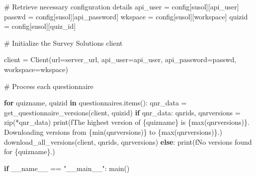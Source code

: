 \documentclass[
  letterpaper,
  DIV=11,
  numbers=noendperiod]{scrreprt}
\newenvironment{Shaded}{\begin{snugshade}}{\end{snugshade}}
\newcommand{\BuiltInTok}[1]{\textcolor[rgb]{0.00,0.23,0.31}{#1}}
\newcommand{\CommentTok}[1]{\textcolor[rgb]{0.37,0.37,0.37}{#1}}
\newcommand{\ControlFlowTok}[1]{\textcolor[rgb]{0.00,0.23,0.31}{\textbf{#1}}}
\newcommand{\KeywordTok}[1]{\textcolor[rgb]{0.00,0.23,0.31}{\textbf{#1}}}
\newcommand{\NormalTok}[1]{\textcolor[rgb]{0.00,0.23,0.31}{#1}}
\newcommand{\OperatorTok}[1]{\textcolor[rgb]{0.37,0.37,0.37}{#1}}
\newcommand{\SpecialCharTok}[1]{\textcolor[rgb]{0.37,0.37,0.37}{#1}}
\newcommand{\SpecialStringTok}[1]{\textcolor[rgb]{0.13,0.47,0.30}{#1}}
\newcommand{\StringTok}[1]{\textcolor[rgb]{0.13,0.47,0.30}{#1}}
\newcommand{\VariableTok}[1]{\textcolor[rgb]{0.07,0.07,0.07}{#1}}
\begin{document}
\begin{Shaded}
\begin{Highlighting}[]
    

    \CommentTok{\# Retrieve necessary configuration details}
\NormalTok{    api\_user }\OperatorTok{=}\NormalTok{ config[}\StringTok{\textquotesingle{}susol\textquotesingle{}}\NormalTok{][}\StringTok{\textquotesingle{}api\_user\textquotesingle{}}\NormalTok{]}
\NormalTok{    passwd }\OperatorTok{=}\NormalTok{ config[}\StringTok{\textquotesingle{}susol\textquotesingle{}}\NormalTok{][}\StringTok{\textquotesingle{}api\_password\textquotesingle{}}\NormalTok{]}
\NormalTok{    wkspace }\OperatorTok{=}\NormalTok{ config[}\StringTok{\textquotesingle{}susol\textquotesingle{}}\NormalTok{][}\StringTok{\textquotesingle{}workspace\textquotesingle{}}\NormalTok{]}
\NormalTok{    quizid }\OperatorTok{=}\NormalTok{ config[}\StringTok{\textquotesingle{}susol\textquotesingle{}}\NormalTok{][}\StringTok{\textquotesingle{}quiz\_id\textquotesingle{}}\NormalTok{]}

   \CommentTok{\# Initialize the Survey Solutions client}
   
\NormalTok{    client }\OperatorTok{=}\NormalTok{ Client(url}\OperatorTok{=}\NormalTok{server\_url, api\_user}\OperatorTok{=}\NormalTok{api\_user, api\_password}\OperatorTok{=}\NormalTok{passwd, workspace}\OperatorTok{=}\NormalTok{wkspace)}

    \CommentTok{\# Process each questionnaire}
    
    \ControlFlowTok{for}\NormalTok{ quizname, quizid }\KeywordTok{in}\NormalTok{ questionnaires.items():}
\NormalTok{        qnr\_data }\OperatorTok{=}\NormalTok{ get\_questionnaire\_versions(client, quizid)}
        \ControlFlowTok{if}\NormalTok{ qnr\_data:}
\NormalTok{            qnrids, qnrversions }\OperatorTok{=} \BuiltInTok{zip}\NormalTok{(}\OperatorTok{*}\NormalTok{qnr\_data)}
            \BuiltInTok{print}\NormalTok{(}\SpecialStringTok{f\textquotesingle{}The highest version of }\SpecialCharTok{\{}\NormalTok{quizname}\SpecialCharTok{\}}\SpecialStringTok{ is }\SpecialCharTok{\{}\BuiltInTok{max}\NormalTok{(qnrversions)}\SpecialCharTok{\}}\SpecialStringTok{. Downloading versions from }\SpecialCharTok{\{}\BuiltInTok{min}\NormalTok{(qnrversions)}\SpecialCharTok{\}}\SpecialStringTok{ to }\SpecialCharTok{\{}\BuiltInTok{max}\NormalTok{(qnrversions)}\SpecialCharTok{\}}\SpecialStringTok{.\textquotesingle{}}\NormalTok{)}
\NormalTok{            download\_all\_versions(client, qnrids, qnrversions)}
        \ControlFlowTok{else}\NormalTok{:}
            \BuiltInTok{print}\NormalTok{(}\SpecialStringTok{f\textquotesingle{}No versions found for }\SpecialCharTok{\{}\NormalTok{quizname}\SpecialCharTok{\}}\SpecialStringTok{.\textquotesingle{}}\NormalTok{)}

\ControlFlowTok{if} \VariableTok{\_\_name\_\_} \OperatorTok{==} \StringTok{"\_\_main\_\_"}\NormalTok{:}
\NormalTok{    main()}
\end{Highlighting}
\end{Shaded}
\end{document}
